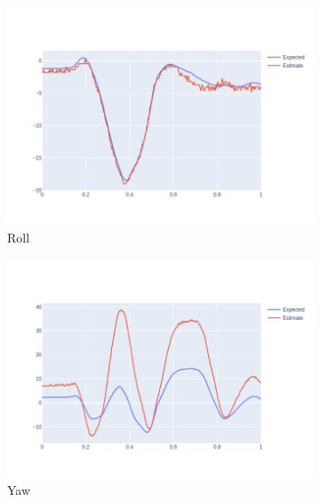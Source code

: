 \documentclass[12pt,a4paper,titlepage,final]{report}
\begin{document}
\begin{figure}[H]
  \centering
  \captionsetup{justification=centering}
  \begin{subfigure}[b]{0.32\textwidth}
    \includegraphics[width=\textwidth]{images/evaluation/tracking_roll_user_01_video_07.png}
   \caption{Roll}
    \label{fig:track_roll}
  \end{subfigure}
  \hfill
  \begin{subfigure}[b]{0.32\textwidth}
    \includegraphics[width=\textwidth]{images/evaluation/tracking_yaw_user_01_video_07.png}
   \caption{Yaw}
    \label{fig:track_yaw}
  \end{subfigure}
  \hfill
    \begin{subfigure}[b]{0.32\textwidth}

\end{subfigure}
\end{figure}
\end{document}
